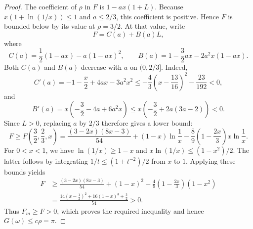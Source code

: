 \begin{proof}
The coefficient of $\rho$ in $F$ is $1-ax(1+L)$. Because $x(1+\ln(1/x))\leq 1$ and $a\leq 2/3$, this coefficient is positive. Hence $F$ is bounded below by its value at $\rho=3/2$. At that value, write
\[
F=C(a)+B(a)L,
\]
where
\[
C(a)=\frac{1}{2}(1-ax)-a(1-ax)^2,\qquad
B(a)=1-\frac{3}{2}ax-2a^2x(1-ax).
\]
Both $C(a)$ and $B(a)$ decrease with $a$ on $(0,2/3]$. Indeed,
\[
C'(a)=-1-\frac{x}{2}+4ax-3a^2x^2
\leq -\frac{4}{3}\left(x-\frac{13}{16}\right)^2-\frac{23}{192}<0,
\]
and
\[
B'(a)=x\left(-\frac{3}{2}-4a+6a^2x\right)
\leq x\left(-\frac{3}{2}+2a(3a-2)\right)<0.
\]
Since $L>0$, replacing $a$ by $2/3$ therefore gives a lower bound:
\[
F\geq F\left(\frac{3}{2},\frac{2}{3},x\right)
=
\frac{(3-2x)(8x-3)}{54}
+(1-x)\ln\frac{1}{x}
-\frac{8}{9}\left(1-\frac{2x}{3}\right)x\ln\frac{1}{x}.
\]
For $0<x<1$, we have $\ln(1/x)\geq 1-x$ and
$x\ln(1/x)\leq (1-x^2)/2$. The latter follows by integrating
$1/t\leq(1+t^{-2})/2$ from $x$ to $1$. Applying these bounds yields
\[
\begin{aligned}
F
&\geq \frac{(3-2x)(8x-3)}{54}
+(1-x)^2
-\frac{4}{9}\left(1-\frac{2x}{3}\right)(1-x^2)\\
&=\frac{14\left(x-\frac{1}{2}\right)^2+16(1-x)^3+\frac{3}{2}}{54}>0.
\end{aligned}
\]
Thus $F_m\geq F>0$, which proves the required inequality and hence
$G\left(\omega\right)\leq c\rho=\pi$.
\end{proof}

